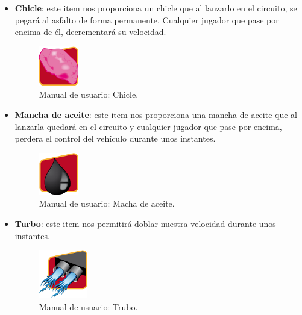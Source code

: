 \begin{itemize}
    \item \textbf{Chicle}: este item nos proporciona un chicle que al lanzarlo en el circuito, se pegará al asfalto de forma 
    permanente. Cualquier jugador que pase por encima de él, decrementará su velocidad.
        \begin{figure}[H]
          \label{chicle}
          \begin{center}
            \includegraphics[scale=1]{imagenes/items/gum.png}
          \end{center}
         \caption{Manual de usuario: Chicle.}
        \end{figure}
        
    \item \textbf{Mancha de aceite}: este item nos proporciona una mancha de aceite que al lanzarla quedará en el circuito y 
    cualquier jugador que pase por encima, perdera el control del vehículo durante unos instantes.
        \begin{figure}[H]
          \label{mancha_aceite}
          \begin{center}
            \includegraphics[scale=1]{imagenes/items/oil.png}
          \end{center}
         \caption{Manual de usuario: Macha de aceite.}
        \end{figure}
    
    \item \textbf{Turbo}: este item nos permitirá doblar nuestra velocidad durante unos instantes.
        \begin{figure}[H]
          \label{turbo}
          \begin{center}
            \includegraphics[scale=1]{imagenes/items/turbo.png}
          \end{center}
         \caption{Manual de usuario: Trubo.}
        \end{figure}
        
\end{itemize}


